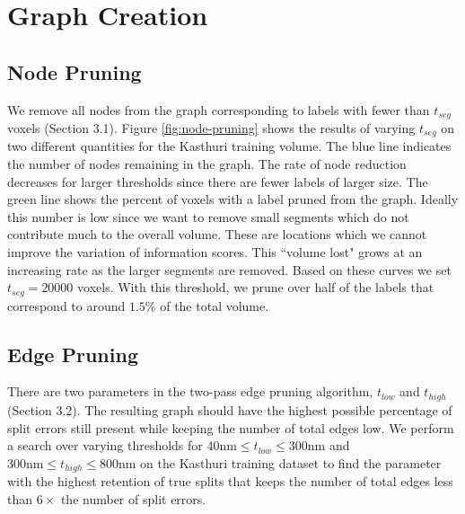 
\section{Graph Creation}

\subsection{Node Pruning}

We remove all nodes from the graph corresponding to labels with fewer than $t_{seg}$ voxels (Section 3.1).
Figure \ref{fig:node-pruning} shows the results of varying $t_{seg}$ on two different quantities for the Kasthuri training volume. 
The blue line indicates the number of nodes remaining in the graph.
The rate of node reduction decreases for larger thresholds since there are fewer labels of larger size. 
The green line shows the percent of voxels with a label pruned from the graph.
Ideally this number is low since we want to remove small segments which do not contribute much to the overall volume.
These are locations which we cannot improve the variation of information scores.
This ``volume lost" grows at an increasing rate as the larger segments are removed. 
Based on these curves we set $t_{seg} = 20000$ voxels.
With this threshold, we prune over half of the labels that correspond to around $1.5\%$ of the total volume.

\subsection{Edge Pruning}

There are two parameters in the two-pass edge pruning algorithm, $t_{low}$ and $t_{high}$ (Section 3.2). 
The resulting graph should have the highest possible percentage of split errors still present while keeping the number of total edges low. 
We perform a search over varying thresholds for $40\textrm{nm} \leq t_{low} \leq 300 \textrm{nm}$ and $300 \textrm{nm} \leq t_{high} \leq 800 \textrm{nm}$ on the Kasthuri training dataset to find the parameter with the highest retention of true splits that keeps the number of total edges less than $6 \times$ the number of split errors. 

